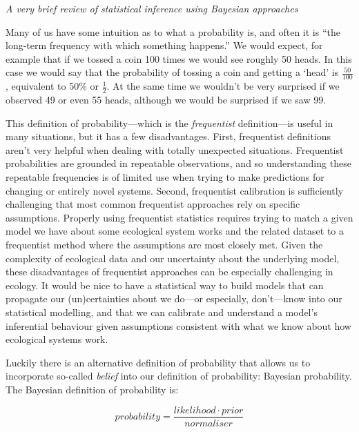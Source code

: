 \documentclass[11pt]{article}
\begin{document}
{\emph{A very brief review of statistical inference using Bayesian approaches}

Many of us have some intuition as to what a probability is, and often it is ``the long-term frequency with which something happens.'' We would expect, for example that if we tossed a coin 100 times we would see roughly 50 heads.  In this case we would say that the probability of tossing a coin and getting a `head' is $\frac{50}{100}$, equivalent to 50\% or $\frac{1}{2}$. At the same time we wouldn’t be very surprised if we observed 49 or even 55 heads, although we would be surprised if we saw 99.

This definition of probability---which is the \emph{frequentist} definition---is useful in many situations, but it has a few disadvantages. First, frequentist definitions aren't very helpful when dealing with totally unexpected situations. Frequentist probabilities are grounded in repeatable observations, and so understanding these repeatable frequencies is of limited use when trying to make predictions for changing or entirely novel systems. Second, frequentist calibration is sufficiently challenging that most common frequentist approaches rely on specific assumptions. Properly using frequentist statistics requires trying to match a given  model we have about some ecological system works and the related dataset to a frequentist method where the assumptions are most closely met. Given the complexity of ecological data and our uncertainty about the underlying model, these disadvantages of frequentist approaches can be especially challenging in ecology. It would be nice to have a statistical way to build models that can propagate our (un)certainties about we do---or especially, don't---know into our statistical modelling, and that we can calibrate and understand a model's inferential behaviour given assumptions consistent with what we know about how ecological systems work. %

Luckily there is an alternative definition of probability that allows us to incorporate so-called \emph{belief} into our definition of probability: Bayesian probability. The Bayesian definition of probability is:

\begin{equation}
  probability = \frac{likelihood \cdot prior}{normaliser}
  \label{bayes_theorem}
\end{equation}

}
\end{document}
